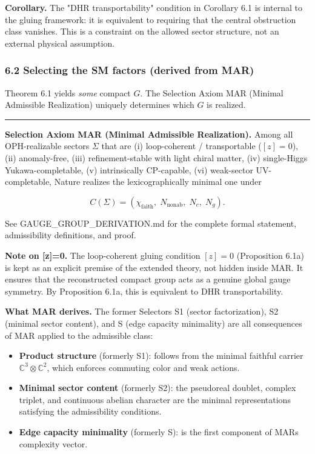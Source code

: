 \textbf{Corollary.} The "DHR transportability" condition in Corollary 6.1 is internal to the gluing framework: it is equivalent to requiring that the central obstruction class vanishes. This is a constraint on the allowed sector structure, not an external physical assumption.

\subsubsection{6.2 Selecting the SM factors (derived from MAR)}\label{62-selecting-the-sm-factors-derived-from-mar}

Theorem 6.1 yields \emph{some} compact \(G\). The Selection Axiom MAR (Minimal Admissible Realization) uniquely determines which \(G\) is realized.

\begin{center}\rule{0.5\linewidth}{0.5pt}\end{center}

\textbf{Selection Axiom MAR (Minimal Admissible Realization).} Among all OPH-realizable sectors \(\Sigma\) that are (i) loop-coherent / transportable (\([z]=0\)), (ii) anomaly-free, (iii) refinement-stable with light chiral matter, (iv) single-Higgs Yukawa-completable, (v) intrinsically CP-capable, (vi) weak-sector UV-completable, Nature realizes the lexicographically minimal one under

\[C(\Sigma) = (\chi_{\mathrm{faith}},\; N_{\mathrm{nonab}},\; N_c,\; N_g).\]

See GAUGE\_GROUP\_DERIVATION.md for the complete formal statement, admissibility definitions, and proof.

\textbf{Note on {[}z{]}=0.} The loop-coherent gluing condition \([z]=0\) (Proposition 6.1a) is kept as an explicit premise of the extended theory, not hidden inside MAR. It ensures that the reconstructed compact group acts as a genuine global gauge symmetry. By Proposition 6.1a, this is equivalent to DHR transportability.

\textbf{What MAR derives.} The former Selectors S1 (sector factorization), S2 (minimal sector content), and S (edge capacity minimality) are all consequences of MAR applied to the admissible class:

\begin{itemize}
\tightlist
\item
  \textbf{Product structure} (formerly S1): follows from the minimal faithful carrier \(\mathbb{C}^3 \otimes \mathbb{C}^2\), which enforces commuting color and weak actions.
\item
  \textbf{Minimal sector content} (formerly S2): the pseudoreal doublet, complex triplet, and continuous abelian character are the minimal representations satisfying the admissibility conditions.
\item
  \textbf{Edge capacity minimality} (formerly S): is the first component of MAR\textquotesingle s complexity vector.
\end{itemize}

